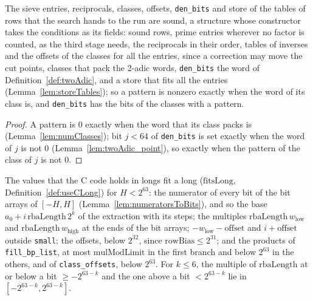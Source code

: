 \begin{lemma}\label{lem:soundRun}
  \leanok
  The sieve entries, reciprocals, classes, offsets, \verb|den_bits| and store of the tables of rows
  that the search hands to the run are sound, a structure whose constructor takes the conditions as
  its fields: sound rows, prime entries wherever no factor is counted, as the third stage needs, the
  reciprocals in their order, tables of inverses and the offsets of the classes for all the entries,
  since a correction may move the cut points, classes that pack the 2-adic words, \verb|den_bits|
  the word of Definition~\ref{def:twoAdic}, and a store that fits all the entries
  (Lemma~\ref{lem:storeTables}); so a pattern is nonzero exactly when the
  word of its class is, and \verb|den_bits| has the bits of the classes with a pattern.
\end{lemma}

\begin{proof}
  \leanok
  A pattern is $0$ exactly when the word that its class packs is (Lemma~\ref{lem:numClasses}); bit
  $j < 64$ of \verb|den_bits| is set exactly when the word of $j$ is not $0$
  (Lemma~\ref{lem:twoAdic_point}), so exactly when the pattern of the class of $j$ is not $0$.
\end{proof}

\begin{lemma}\label{lem:packingLongs}
  \leanok
  The values that the C code holds in longs fit a long ($\mathrm{fitsLong}$,
  Definition~\ref{def:useCLong}) for $H < 2^{63}$: the numerator of every bit of the bit arrays of
  $[-H, H]$ (Lemma~\ref{lem:numeratorsToBits}), and so the base $a_0 + i\,\mathrm{rbaLength}\, 2^k$
  of the extraction with its steps; the multiples $\mathrm{rbaLength}\, w_{\mathrm{low}}$ and
  $\mathrm{rbaLength}\, w_{\mathrm{high}}$ at the ends of the bit arrays;
  $-w_{\mathrm{low}} - \mathrm{offset}$ and $i + \mathrm{offset}$ outside \verb|small|; the offsets,
  below $2^{32}$, since $\mathrm{rowBias} \le 2^{31}$; and the products of \verb|fill_bp_list|, at
  most $\mathrm{mulModLimit}$ in the first branch and below $2^{63}$ in the others, and of
  \verb|class_offsets|, below $2^{63}$. For $k \le 6$, the multiple of $\mathrm{rbaLength}$ at or
  below a bit $\ge -2^{63-k}$ and the one above a bit $< 2^{63-k}$ lie in
  $[-2^{63-k}, 2^{63-k}]$.
\end{lemma}


